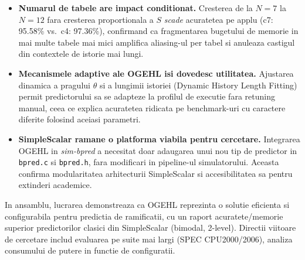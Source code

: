 \begin{itemize}
    \item \textbf{Numarul de tabele are impact conditionat.}
          Cresterea de la $N=7$ la $N=12$ fara cresterea proportionala a $S$
          \textit{scade} acuratetea pe applu (c7: 95.58\% vs.\ c4: 97.36\%),
          confirmand ca fragmentarea bugetului de memorie in mai multe tabele
          mai mici amplifica aliasing-ul per tabel si anuleaza castigul din
          contextele de istorie mai lungi.

    \item \textbf{Mecanismele adaptive ale OGEHL isi dovedesc utilitatea.}
          Ajustarea dinamica a pragului $\theta$ si a lungimii istoriei
          (Dynamic History Length Fitting) permit predictorului sa se
          adapteze la profilul de executie fara retuning manual, ceea ce
          explica acuratetea ridicata pe benchmark-uri cu caractere diferite
          folosind aceiasi parametri.

    \item \textbf{SimpleScalar ramane o platforma viabila pentru cercetare.}
          Integrarea OGEHL in \textit{sim-bpred} a necesitat doar adaugarea
          unui nou tip de predictor in \texttt{bpred.c} si \texttt{bpred.h},
          fara modificari in pipeline-ul simulatorului. Aceasta confirma
          modularitatea arhitecturii SimpleScalar si accesibilitatea sa pentru
          extinderi academice.
\end{itemize}

In ansamblu, lucrarea demonstreaza ca OGEHL reprezinta o solutie eficienta si
configurabila pentru predictia de ramificatii, cu un raport acuratete/memorie
superior predictorilor clasici din SimpleScalar (bimodal, 2-level). Directii
viitoare de cercetare includ evaluarea pe suite mai largi (SPEC CPU2000/2006),
analiza consumului de putere in functie de configuratii.
